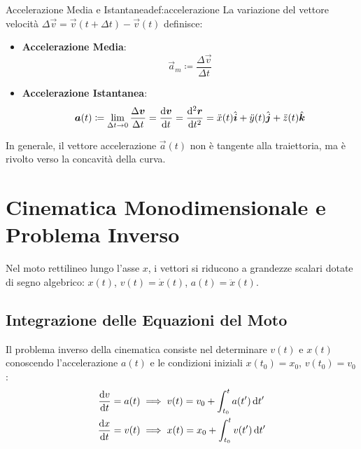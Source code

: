 \begin{definizione}{Accelerazione Media e Istantanea}{def:accelerazione}
La variazione del vettore velocità $\Delta\vec{v} = \vec{v}(t+\Delta t) - \vec{v}(t)$ definisce:
\begin{itemize}
    \item \textbf{Accelerazione Media}:
    \begin{equation}
        \vec{a}_m \coloneqq \frac{\Delta\vec{v}}{\Delta t}
    \end{equation}
    \item \textbf{Accelerazione Istantanea}:
    \begin{equation}
        \bm{a}(t) \coloneqq \lim_{\Delta t \to 0} \frac{\Delta\bm{v}}{\Delta t} = \frac{\mathrm{d} \bm{v}}{\mathrm{d} t} = \frac{\mathrm{d}^2 \bm{r}}{\mathrm{d} t^2} = \ddot{x}(t)\hat{\bm{i}} + \ddot{y}(t)\hat{\bm{j}} + \ddot{z}(t)\hat{\bm{k}}
        \label{eq:accelerazione_istantanea}
    \end{equation}
\end{itemize}
In generale, il vettore accelerazione $\vec{a}(t)$ non è tangente alla traiettoria, ma è rivolto verso la concavità della curva.
\end{definizione}

\section{Cinematica Monodimensionale e Problema Inverso}
\label{sec:moto_rettilineo}

Nel moto rettilineo lungo l'asse $x$, i vettori si riducono a grandezze scalari dotate di segno algebrico: $x(t)$, $v(t) = \dot{x}(t)$, $a(t) = \ddot{x}(t)$.

\subsection{Integrazione delle Equazioni del Moto}
Il problema inverso della cinematica consiste nel determinare $v(t)$ e $x(t)$ conoscendo l'accelerazione $a(t)$ e le condizioni iniziali $x(t_0) = x_0$, $v(t_0) = v_0$:
\begin{align}
    \frac{\mathrm{d} v}{\mathrm{d} t} = a(t) &\implies v(t) = v_0 + \int_{t_0}^t a(t')\,\mathrm{d} t' \label{eq:int_v} \\
    \frac{\mathrm{d} x}{\mathrm{d} t} = v(t) &\implies x(t) = x_0 + \int_{t_0}^t v(t')\,\mathrm{d} t' \label{eq:int_x}
\end{align}


